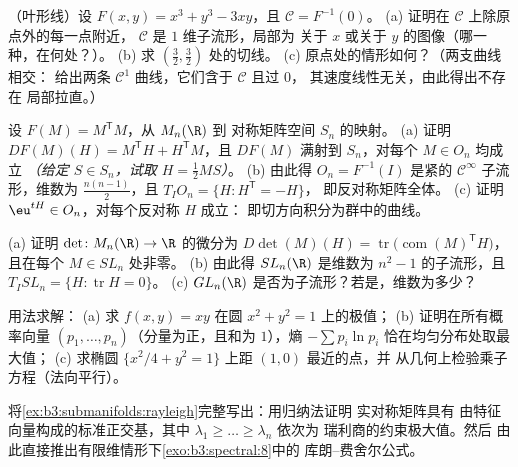\begin{exercise}[$\star\star$]\label{exo:b3:submanifolds:4}
（叶形线）设 $F(x,y) = x^3 + y^3 - 3xy$，且 $\mathcal C =
F^{-1}(0)$。
(a) 证明在 $\mathcal C$ 上除原点外的每一点附近，
$\mathcal C$ 是 $1$ 维子流形，局部为
关于 $x$ 或关于 $y$ 的图像（哪一种，在何处？）。
(b) 求 $(\frac32, \frac32)$ 处的切线。
(c) 原点处的情形如何？（两支曲线相交：
给出两条 $\mathcal C^1$ 曲线，它们含于 $\mathcal C$ 且过 $0$，
其速度线性无关，由此得出不存在
局部拉直。）
\end{exercise}

\begin{exercise}[$\star\star$]\label{exo:b3:submanifolds:5}
设 $F(M) = M^{\mathsf T}M$，从 $M_n(\R)$ 到
对称矩阵空间 $S_n$ 的映射。
(a) 证明 $DF(M)(H) = M^{\mathsf T}H + H^{\mathsf T}M$，且
$DF(M)$ 满射到 $S_n$，对每个 $M \in O_n$ 均成立
\emph{（给定 $S \in S_n$，试取 $H = \frac12MS$）}。
(b) 由此得 $O_n = F^{-1}(I)$ 是紧的
$\mathcal C^\infty$ 子流形，维数为
$\frac{n(n-1)}2$，且 $T_IO_n = \{H : H^{\mathsf T} = -H\}$，
即反对称矩阵全体。
(c) 证明 $\eu^{tH} \in O_n$，对每个反对称 $H$ 成立：
即切方向积分为群中的曲线。
\end{exercise}

\begin{exercise}[$\star\star$]\label{exo:b3:submanifolds:6}
(a) 证明 $\det \colon M_n(\R) \to \R$ 的微分为
$D\det(M)(H) = \operatorname{tr}\bigl(\operatorname{com}(M)
^{\mathsf T}H\bigr)$，且在每个 $M \in SL_n$ 处非零。
(b) 由此得 $SL_n(\R)$ 是维数为
$n^2 - 1$ 的子流形，且 $T_ISL_n = \{H : \operatorname{tr}H = 0\}$。
(c) $GL_n(\R)$ 是否为子流形？若是，维数为多少？
\end{exercise}

\begin{exercise}[$\star\star$]\label{exo:b3:submanifolds:7}
用法求解：
(a) 求 $f(x,y) = xy$ 在圆 $x^2 +
y^2 = 1$ 上的极值；
(b) 证明在所有概率向量 $(p_1, \dots,
p_n)$（分量为正，且和为 $1$），熵 $-\sum
p_i\ln p_i$ 恰在均匀分布处取最大值；
(c) 求椭圆 $\{x^2/4 + y^2 = 1\}$
上距 $(1, 0)$ 最近的点，并
从几何上检验乘子方程（法向平行）。
\end{exercise}

\begin{exercise}[$\star\star\star$]\label{exo:b3:submanifolds:8}
将\cref{ex:b3:submanifolds:rayleigh}完整写出：用归纳法证明
实对称矩阵具有
由特征向量构成的标准正交基，其中
$\lambda_1 \geq \dots \geq \lambda_n$ 依次为
瑞利商的约束极大值。然后
由此直接推出有限维情形下\cref{exo:b3:spectral:8}中的
库朗–费舍尔公式。
\end{exercise}

